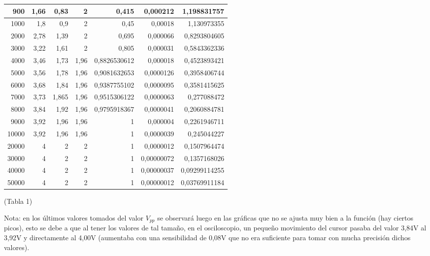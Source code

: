 \documentclass{article}
\begin{document}
\begin{table}[h]
\begin{tabular}{|r|r|r|r|r|r|r|}
900   & 1,66  & 0,83  & 2    & 0,415         & 0,000212   & 1,198831757   \\ \hline
1000  & 1,8   & 0,9   & 2    & 0,45          & 0,00018    & 1,130973355   \\ \hline
2000  & 2,78  & 1,39  & 2    & 0,695         & 0,000066   & 0,8293804605  \\ \hline
3000  & 3,22  & 1,61  & 2    & 0,805         & 0,000031   & 0,5843362336  \\ \hline
4000  & 3,46  & 1,73  & 1,96 & 0,8826530612  & 0,000018   & 0,4523893421  \\ \hline
5000  & 3,56  & 1,78  & 1,96 & 0,9081632653  & 0,0000126  & 0,3958406744  \\ \hline
6000  & 3,68  & 1,84  & 1,96 & 0,9387755102  & 0,0000095  & 0,3581415625  \\ \hline
7000  & 3,73  & 1,865 & 1,96 & 0,9515306122  & 0,0000063  & 0,277088472   \\ \hline
8000  & 3,84  & 1,92  & 1,96 & 0,9795918367  & 0,0000041  & 0,2060884781  \\ \hline
9000  & 3,92  & 1,96  & 1,96 & 1             & 0,000004   & 0,2261946711  \\ \hline
10000 & 3,92  & 1,96  & 1,96 & 1             & 0,0000039  & 0,245044227   \\ \hline
20000 & 4     & 2     & 2    & 1             & 0,0000012  & 0,1507964474  \\ \hline
30000 & 4     & 2     & 2    & 1             & 0,00000072 & 0,1357168026  \\ \hline
40000 & 4     & 2     & 2    & 1             & 0,00000037 & 0,09299114255 \\ \hline
50000 & 4     & 2     & 2    & 1             & 0,00000012 & 0,03769911184 \\ \hline

\end{tabular}
\end{table}
\begin{center}
{(Tabla 1)}
\end{center}
Nota: en los últimos valores tomados del valor $V_{pp}$ se observará luego en las gráficas que no se ajusta muy bien a la función (hay ciertos picos), esto se debe a que al tener los valores de tal tamaño, en el osciloscopio, un pequeño movimiento del cursor pasaba del valor 3,84V al 3,92V y directamente al 4,00V (aumentaba con una sensibilidad de 0,08V que no era suficiente para tomar con mucha precisión dichos valores).

\cleardoublepage
\end{document}

